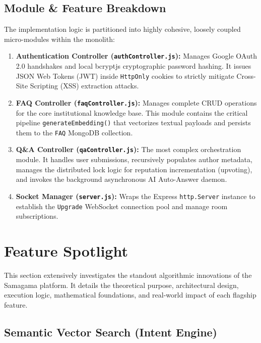 \documentclass[12pt,a4paper]{article}
\begin{document}
\subsection{Module \& Feature Breakdown}
The implementation logic is partitioned into highly cohesive, loosely coupled micro-modules within the monolith:
\begin{enumerate}
    \item \textbf{Authentication Controller (\texttt{authController.js}):} Manages Google OAuth 2.0 handshakes and local bcryptjs cryptographic password hashing. It issues JSON Web Tokens (JWT) inside \texttt{HttpOnly} cookies to strictly mitigate Cross-Site Scripting (XSS) extraction attacks.
    \item \textbf{FAQ Controller (\texttt{faqController.js}):} Manages complete CRUD operations for the core institutional knowledge base. This module contains the critical pipeline \texttt{generate\-Embedding()} that vectorizes textual payloads and persists them to the \texttt{FAQ} MongoDB collection.
    \item \textbf{Q\&A Controller (\texttt{qaController.js}):} The most complex orchestration module. It handles user submissions, recursively populates author metadata, manages the distributed lock logic for reputation incrementation (upvoting), and invokes the background asynchronous AI Auto-Answer daemon.
    \item \textbf{Socket Manager (\texttt{server.js}):} Wraps the Express \texttt{http.Server} instance to establish the \texttt{Upgrade} WebSocket connection pool and manage room subscriptions.
\end{enumerate}

\newpage

\section{Feature Spotlight}
\vspace{0.5cm}
This section extensively investigates the standout algorithmic innovations of the Samagama platform. It details the theoretical purpose, architectural design, execution logic, mathematical foundations, and real-world impact of each flagship feature.

\subsection{Semantic Vector Search (Intent Engine)}
\end{document}

